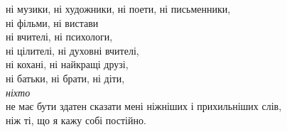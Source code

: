 ні музики, ні художники, ні поети, ні письменники,\\
ні фільми, ні вистави\\

ні вчителі, ні психологи,\\
ні цілителі, ні духовні вчителі,\\
ні кохані, ні найкращі друзі,\\
ні батьки, ні брати, ні діти,\\

\emph{ніхто}\\

не має бути здатен сказати мені ніжніших і прихильніших слів,\\
ніж ті, що я кажу собі постійно.
